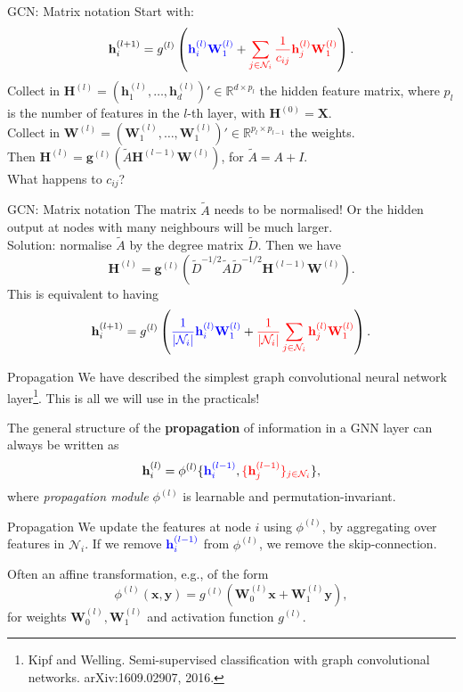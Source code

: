 \documentclass{beamer}
\begin{document}
\begin{frame}{GCN: Matrix notation}
Start with:
\[
\mathbf{h}_i^{(l+1)}=g^{(l)}\left({\color{blue}\mathbf{h}_i^{(l)}\mathbf{W}_1^{(l)}}+{\color{red}\sum_{j\in\mathcal{N}_i}\frac{1}{c_{ij}}\mathbf{h}_j^{(l)}\mathbf{W}_1^{(l)}}\right).
\]
Collect in $\mathbf{H}^{(l)}=(\mathbf{h}_1^{(l)},\dots,\mathbf{h}_d^{(l)})'\in \mathbb{R}^{d \times p_l}$ the hidden feature matrix, where $p_{l}$ is the number of features in the $l$-th layer, with $\mathbf{H}^{(0)}=\mathbf{X}$.\\\vfill Collect in $\mathbf{W}^{(l)}=(\mathbf{W}_1^{(l)},\dots,\mathbf{W}_{1}^{(l)})'\in \mathbb{R}^{p_l\times p_{l-1}}$ the weights.\\\vfill
Then $\mathbf{H}^{(l)}=\mathbf{g}^{(l)}(\tilde{A}\mathbf{H}^{(l-1)}\mathbf{W}^{(l)})$, for $\tilde{A}=A+I$.\\

What happens to $c_{ij}$?
\end{frame}
\begin{frame}{GCN: Matrix notation}
The matrix $\tilde{A}$ needs to be normalised! Or the hidden output at nodes with many neighbours will be much larger.\\

Solution: normalise $\tilde{A}$ by the degree matrix $\tilde{D}$. Then we have
\[
\mathbf{H}^{(l)}=\mathbf{g}^{(l)}(\tilde{D}^{-1/2}\tilde{A}\tilde{D}^{-1/2}\mathbf{H}^{(l-1)}\mathbf{W}^{(l)}).
\]
This is equivalent to having
\[
\mathbf{h}_i^{(l+1)}=g^{(l)}\left({\color{blue}\frac{1}{|\mathcal{N}_i|}\mathbf{h}_i^{(l)}\mathbf{W}_1^{(l)}}+{\color{red}\frac{1}{|\mathcal{N}_i|}\sum_{j\in\mathcal{N}_i}\mathbf{h}_j^{(l)}\mathbf{W}_1^{(l)}}\right).
\]
\end{frame}
\begin{frame}{Propagation}
We have described the simplest graph convolutional neural network layer\footnote{Kipf and Welling. Semi-supervised classification with graph
convolutional networks. arXiv:1609.02907, 2016.}. This is all we will use in the practicals!

The general structure of the \textbf{propagation} of information in a GNN layer can always be written as 
\[
\mathbf{h}_i^{(l)}=\phi^{(l)}\{{\color{blue}\mathbf{h}_i^{(l-1)}},{\color{red}\{\mathbf{h}_j^{(l-1)}\}_{j\in\mathcal{N}_i}}\},
\]
where \textit{propagation module} $\phi^{(l)}$ is learnable and permutation-invariant. 
\end{frame}
\begin{frame}{Propagation}
We update the features at node $i$ using $\phi^{(l)}$, by aggregating over features in $\mathcal{N}_i$. If we remove ${\color{blue}\mathbf{h}_i^{(l-1)}}$ from $\phi^{(l)}$, we remove the skip-connection.\\\vfill

Often an affine transformation, e.g., of the form
\[
\phi^{(l)}(\mathbf{x},\mathbf{y})=g^{(l)}(\mathbf{W}_0^{(l)}\mathbf{x}+\mathbf{W}_1^{(l)}\mathbf{y}),
\]
for weights $\mathbf{W}_0^{(l)},\mathbf{W}_1^{(l)}$ and activation function $g^{(l)}$.
\end{frame}
\end{document}
